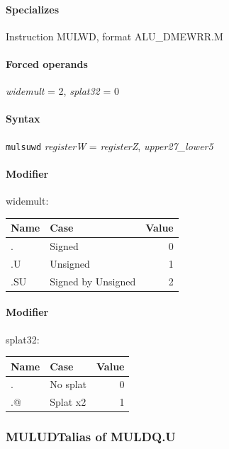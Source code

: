 {


\paragraph{Specializes} Instruction MULWD, format ALU\_DMEWRR.M

\paragraph{Forced operands} \emph{widemult} = 2, \emph{splat32} = 0

\paragraph{Syntax} \texttt{mulsuwd} \emph{registerW} = \emph{registerZ}, \emph{upper27\_lower5}

\paragraph{Modifier} \textsf{widemult}:\\

\noindent \begin{tabular}{|l|l|r|} \hline
\bf{Name} & \bf{Case} & \bf{Value} \\ \hline
. & Signed & 0 \\
.U & Unsigned & 1 \\
.SU & Signed by Unsigned & 2 \\
\hline \end{tabular}

\paragraph{Modifier} \textsf{splat32}:\\

\noindent \begin{tabular}{|l|l|r|} \hline
\bf{Name} & \bf{Case} & \bf{Value} \\ \hline
. & No splat & 0 \\
.@ & Splat x2 & 1 \\
\hline \end{tabular}
\newpage
\subsubsection[{\small MULUDT: alias of MULDQ.U}]{MULUDT\hfill alias of MULDQ.U}
\label{instr:MULUDT}

}
